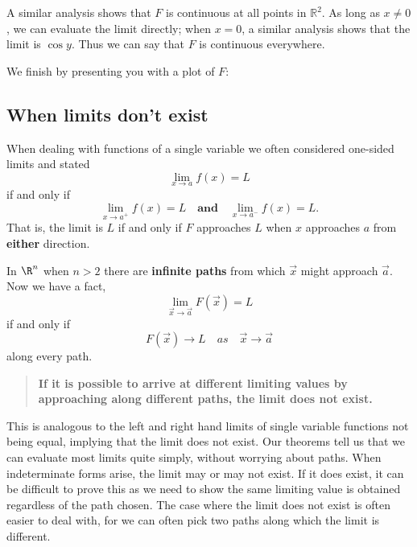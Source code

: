 \documentclass{ximera}
\begin{document}
\begin{example}
\begin{explanation}
    A similar analysis shows that $F$ is continuous at all points in
    $\mathbb{R}^2$. As long as $x\neq0$, we can evaluate the limit
    directly; when $x=0$, a similar analysis shows that the limit is $\cos
    y$. Thus we can say that $F$ is continuous everywhere.
    \begin{onlineOnly}
      We finish by presenting you with a plot of $F$:
      \begin{center}
      \end{center}
    \end{onlineOnly}
  \end{explanation}
\end{example}


\subsection{When limits don't exist}

When dealing with functions of a single variable we often considered
one-sided limits and stated
\[
\lim_{x\to a}f(x) = L
\]
if and only if
\[
\lim_{x\to a^+}f(x) =L \quad\textbf{and}\quad \lim_{x\to a^-}f(x) =L.
\]
That is, the limit is $L$ if and only if $F$ approaches $L$ when
$x$ approaches $a$ from \textbf{either} direction.

In $\R^n$ when $n>2$ there are \textbf{infinite paths} from which
$\vec{x}$ might approach $\vec{a}$. Now we have a fact, 
\[
\lim_{\vec{x}\to \vec{a}}F(\vec{x}) = L
\]
if and only if
\[
F(\vec{x})\to  L \quad{as}\quad \vec{x}\to \vec{a}
\]
along every path.
\begin{quote}
  \textbf{If it is possible to arrive at different limiting values by
    approaching along different paths, the limit does not exist.}
\end{quote}
This is analogous to the left and right hand limits of single variable
functions not being equal, implying that the limit does not exist.
Our theorems tell us that we can evaluate most limits quite simply,
without worrying about paths. When indeterminate forms arise, the
limit may or may not exist. If it does exist, it can be difficult to
prove this as we need to show the same limiting value is obtained
regardless of the path chosen.  The case where the limit does not
exist is often easier to deal with, for we can often pick two paths
along which the limit is different.
\end{document}
